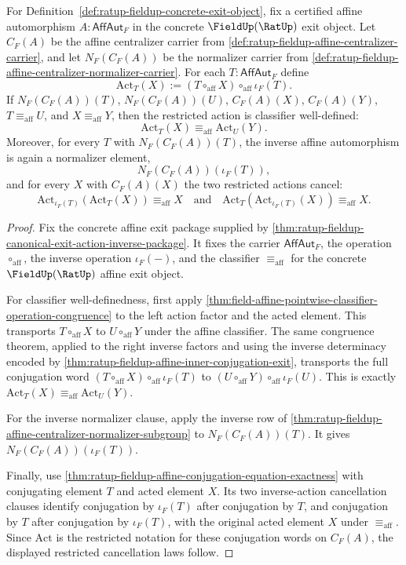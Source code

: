 \begin{theorem}
\label{thm:ratup-fieldup-affine-centralizer-normalizer-action-certificate}
For Definition~\ref{def:ratup-fieldup-concrete-exit-object}, fix a certified
affine automorphism $A:\mathsf{AffAut}_F$ in the concrete $\FieldUp(\RatUp)$
exit object. Let $C_F(A)$ be the affine centralizer carrier from
\autoref{def:ratup-fieldup-affine-centralizer-carrier}, and let
$N_F(C_F(A))$ be the normalizer carrier from
\autoref{def:ratup-fieldup-affine-centralizer-normalizer-carrier}. For each
$T:\mathsf{AffAut}_F$ define
$$
\mathrm{Act}_T(X):=(T\circ_{\mathrm{aff}}X)\circ_{\mathrm{aff}}\iota_F(T).
$$
If $N_F(C_F(A))(T)$, $N_F(C_F(A))(U)$, $C_F(A)(X)$, $C_F(A)(Y)$,
$T\equiv_{\mathrm{aff}}U$, and $X\equiv_{\mathrm{aff}}Y$, then the restricted
action is classifier well-defined:
$$
\mathrm{Act}_T(X)\equiv_{\mathrm{aff}}\mathrm{Act}_U(Y).
$$
Moreover, for every $T$ with $N_F(C_F(A))(T)$, the inverse affine automorphism
is again a normalizer element,
$$
N_F(C_F(A))(\iota_F(T)),
$$
and for every $X$ with $C_F(A)(X)$ the two restricted actions cancel:
$$
\mathrm{Act}_{\iota_F(T)}(\mathrm{Act}_T(X))\equiv_{\mathrm{aff}}X
\quad\text{and}\quad
\mathrm{Act}_T(\mathrm{Act}_{\iota_F(T)}(X))\equiv_{\mathrm{aff}}X.
$$
\end{theorem}
\begin{proof}
Fix the concrete affine exit package supplied by
\autoref{thm:ratup-fieldup-canonical-exit-action-inverse-package}. It fixes the
carrier $\mathsf{AffAut}_F$, the operation $\circ_{\mathrm{aff}}$, the inverse
operation $\iota_F(-)$, and the classifier $\equiv_{\mathrm{aff}}$ for the
concrete $\FieldUp(\RatUp)$ affine exit object.

For classifier well-definedness, first apply
\autoref{thm:field-affine-pointwise-classifier-operation-congruence} to the
left action factor and the acted element. This transports
$T\circ_{\mathrm{aff}}X$ to $U\circ_{\mathrm{aff}}Y$ under the affine
classifier. The same congruence theorem, applied to the right inverse factors
and using the inverse determinacy encoded by
\autoref{thm:ratup-fieldup-affine-inner-conjugation-exit}, transports the full
conjugation word
$(T\circ_{\mathrm{aff}}X)\circ_{\mathrm{aff}}\iota_F(T)$ to
$(U\circ_{\mathrm{aff}}Y)\circ_{\mathrm{aff}}\iota_F(U)$. This is exactly
$\mathrm{Act}_T(X)\equiv_{\mathrm{aff}}\mathrm{Act}_U(Y)$.

For the inverse normalizer clause, apply the inverse row of
\autoref{thm:ratup-fieldup-affine-centralizer-normalizer-subgroup} to
$N_F(C_F(A))(T)$. It gives $N_F(C_F(A))(\iota_F(T))$.

Finally, use
\autoref{thm:ratup-fieldup-affine-conjugation-equation-exactness} with
conjugating element $T$ and acted element $X$. Its two inverse-action
cancellation clauses identify conjugation by $\iota_F(T)$ after conjugation by
$T$, and conjugation by $T$ after conjugation by $\iota_F(T)$, with the original
acted element $X$ under $\equiv_{\mathrm{aff}}$. Since $\mathrm{Act}$ is the
restricted notation for these conjugation words on $C_F(A)$, the displayed
restricted cancellation laws follow.
\end{proof}

